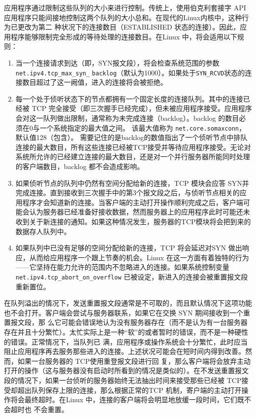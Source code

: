应用程序通过限制这些队列的大小来进行控制。传统上，使用伯克利套接字 API 应用程序只能间接地控制这两个队列的大小总和。在现代的Linux内核中，这种行为已更改为第二
种状况下的连接数目（ESTABLISHED 状态的连接）。因此，应用程序能够限制完全形成的等待处理的连接数目。在Linux 中，将会适用以下规则：
\begin{enumerate}
	\item 当一个连接请求到达（即，SYN报文段），将会检查系统范围的参数 \verb|net.ipv4.tcp_max_syn_| \verb|backlog|（默认为1000）。如果处于\verb|SYN_RCVD|状态的连接数目超过了这一阙值，进入的连接将会被拒绝。
	\item 每一个处于侦听状态下的节点都拥有一个固定长度的连接队列。其中的连接已经被 TCP 完全接受（即三次握手已经完成），但未被应用程序接受。应用程序会对这一队列做出限制，通常称为未完成连接（backlog）。backlog 的数目必须在0与一个系统指定的最大值之间。
	      该最大值称为 \verb|net.core.somaxconn|，默认值128（包含）。
	      需要记住的是backlog的数值指出了一个侦听节点中排队连接的最大数目，所有这些连接已经被TCP接受并等待应用程序接受。无论对系统所允许的已经建立连接的最大数目，还是对一个并行服务器所能同时处理的客户端数目，backlog 都不会造成影响。
	\item 如果侦听节点的队列中仍然有空间分配给新的连接，TCP 模块会应答 SYN并完成连接。直到接收到三次握手中的第3个报文段之后，与侦听节点相关的应用程序才会知道新的连接。当客户端的主动打开操作顺利完成之后，客户端可能会认为服务器已经准备好接收数据，然而服务器上的应用程序此时可能还未收到关于新连接的通知。如果这种情况发生，服务器的TCP模块将会把到来的数据存人队列中。
	\item 如果队列中已没有足够的空间分配给新的连接，TCP 将会延迟对SYN 做出响应，从而给应用程序一个跟上节奏的机会。Linux 在这一方面有着独特的行为——它坚持在能力允许的范围内不忽略进入的连接。如果系统控制变量 \verb|net.ipv4.tcp_abort_on_overflow| 已被设定，新进入的连接会被重置报文段重新置位。
\end{enumerate}

在队列溢出的情况下，发送重置报文段通常是不可取的，而且默认情况下这项功能也不会打开。客户端会尝试与服务器联系，如果它在交换 SYN 期间接收到一个重置报文段，那
么它可能会错误地认为没有服务器存在（而不是认为有一台服务器存在并且十分繁忙）。太忙实际上是一种“软”的或者暂时的错误，而不是一种硬性的错误。正常情况下，当队列已
满，应用程序或操作系统会十分繁忙，此时应当阻止应用程序再去服务那些进入的连接。上述状况可能会在短时间内得到改善。然而，如果一台服务器的 TCP使用重登报文段进行回
复，那么客户端将会放弃主动打开的操作（这与服务器没有启动时所看到的情况是类似的）。在不发送重置报文段的情况下，如果一台侦听的服务器始终无法抽出时间来接受那些已经被
TCP接受却超出队列保存上限的连接，那么根据正常的TCP 机制，寄户端的主动打开操作将会最终超时。在Linux 中，连接的客户端将会明显地放缓一段时间，它们既不会超时也
不会重置。

